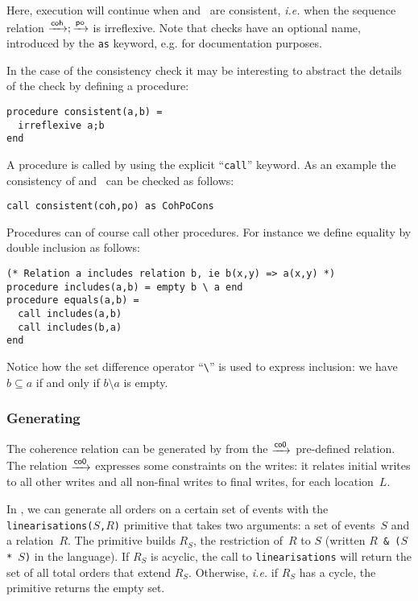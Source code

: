 \documentclass[a4paper]{article}
\begin{document}
Here, execution will continue when \coh{} and~\po{} are consistent, \emph{i.e.}
when the sequence relation $\xrightarrow{\textsf{\scriptsize{}coh}}; \xrightarrow{\textsf{\scriptsize{}po}}$ is irreflexive.  Note that checks have
an optional name, introduced by the \texttt{as} keyword, e.g. for documentation
purposes.

In the case of the consistency check it may be interesting to abstract the
details of the check by defining a procedure:
\begin{verbatim}
procedure consistent(a,b) =
  irreflexive a;b
end
\end{verbatim}

A procedure is called by using the explicit ``\texttt{call}'' keyword.
As an example the consistency of \coh{} and~\po{} can be checked as follows:
\begin{verbatim}
call consistent(coh,po) as CohPoCons
\end{verbatim}

Procedures can of course call other procedures.
For instance we define equality by double inclusion as follows:
\begin{verbatim}
(* Relation a includes relation b, ie b(x,y) => a(x,y) *)
procedure includes(a,b) = empty b \ a end
procedure equals(a,b) =
  call includes(a,b)
  call includes(b,a)
end
\end{verbatim}
Notice how the set difference operator ``\verb+\+'' is used to express
inclusion: we have $b \subseteq a$ if and only if $b \setminus a$ is empty.

\subsubsection{\label{coh}Generating \coh}

The coherence relation can be generated by  from the $\xrightarrow{\textsf{\scriptsize{}co0}}$
pre-defined relation. The relation $\xrightarrow{\textsf{\scriptsize{}co0}}$ expresses some constraints on the
writes: it relates initial writes to all other writes and all non-final writes
to final writes, for each location~$L$.


In , we can generate all orders on a certain set of events with the
\texttt{linearisations($S$,$R$)} primitive that takes two arguments: a set of
events~$S$ and a relation~$R$.  The primitive builds $R_S$, the restriction
of~$R$ to $S$ (written \texttt{$R$ \& ($S$ * $S$)} in the \cat{} language).  If
$R_S$ is acyclic, the call to {\tt linearisations} will return the set of all
total orders that extend $R_S$. Otherwise, \emph{i.e.} if $R_S$ has a cycle,
the primitive returns the empty set. 
\end{document}
